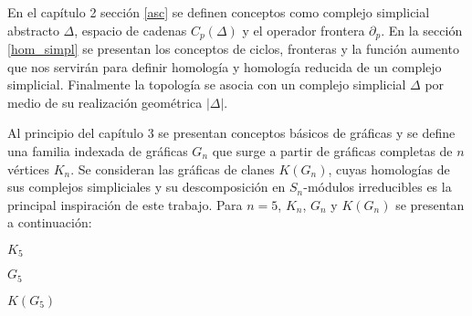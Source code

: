 \documentclass[12pt]{book}
\theoremstyle{definition}
\newcounter{in}
\newcounter{ini}
\begin{document}
 En el capítulo 2 sección \ref{asc} se definen conceptos como complejo
 simplicial abstracto $\Delta$, espacio de cadenas $C_{p}(\Delta)$ y
 el operador frontera $\partial_{p}$. En la sección \ref{hom_simpl} se
 presentan los conceptos de ciclos, fronteras y la función aumento que
 nos servirán para definir homología y homología reducida de un
 complejo simplicial. Finalmente la topología se asocia con un
 complejo simplicial $\Delta$ por medio de su realización geométrica
 $|\Delta|$.

Al principio del capítulo $3$ se presentan conceptos básicos de gráficas y se define una familia indexada de gráficas $G_n$ que surge a partir de gráficas completas
de $n$ vértices $K_n$. Se consideran las gráficas de clanes $K(G_n)$, cuyas homologías de sus complejos
simpliciales y su descomposición en $S_n$-módulos
irreducibles es la principal inspiración de este trabajo. Para $n = 5$, $K_n$, $G_n$
y $K(G_n)$ se presentan a continuación:

\begin{center}
  \begin{minipage}{0.3\linewidth}
    \centering
  
    $K_{5}$
  \end{minipage}
  \bigskip

\begin{minipage}{0.33\linewidth}
  \centering

  $G_{5}$
\end{minipage}\quad
\begin{minipage}{0.33\linewidth}
  \centering
 
  $K(G_{5})$
\end{minipage}
\end{center} 
\end{document}
